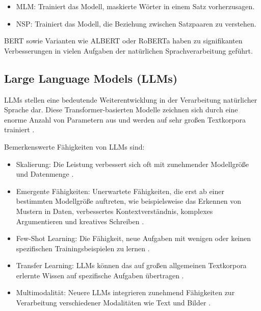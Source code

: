 \begin{itemize}
	\item \gls{MLM}: Trainiert das Modell, maskierte Wörter in einem Satz vorherzusagen.
	\item \gls{NSP}: Trainiert das Modell, die Beziehung zwischen Satzpaaren zu verstehen.
\end{itemize}

\gls{BERT} \parencite{DevlinJacob2019BPoD} sowie Varianten wie ALBERT \parencite{LanZhenzhong2019AALB} oder RoBERTa \parencite{liu2019robertarobustlyoptimizedbert} haben zu signifikanten Verbesserungen in vielen Aufgaben der natürlichen Sprachverarbeitung geführt.

\subsection{Large Language Models (LLMs)}
\label{subsec:llms}

\glspl{LLM} stellen eine bedeutende Weiterentwicklung in der Verarbeitung natürlicher Sprache dar. Diese Transformer-basierten Modelle zeichnen sich durch eine enorme Anzahl von Parametern aus und werden auf sehr großen Textkorpora trainiert \parencite{VaswaniAshish2023AIAY}.

Bemerkenswerte Fähigkeiten von \glspl{LLM} sind:

\begin{itemize}
	\item Skalierung: Die Leistung verbessert sich oft mit zunehmender Modellgröße und Datenmenge \parencite{TouvronHugo2023LOaE}.
	\item Emergente Fähigkeiten: Unerwartete Fähigkeiten, die erst ab einer bestimmten Modellgröße auftreten, wie beispielsweise das Erkennen von Mustern in Daten, verbessertes Kontextverständnis, komplexes Argumentieren und kreatives Schreiben \parencite{BrownTomB2020LMaF}.
	\item Few-Shot Learning: Die Fähigkeit, neue Aufgaben mit wenigen oder keinen spezifischen Trainingsbeispielen zu lernen \parencite{BrownTomB2020LMaF}.
	\item Transfer Learning: \glspl{LLM} können das auf großen allgemeinen Textkorpora erlernte Wissen auf spezifische Aufgaben übertragen \parencite{DevlinJacob2019BPoD}.
	\item Multimodalität: Neuere \glspl{LLM} integrieren zunehmend Fähigkeiten zur Verarbeitung verschiedener Modalitäten wie Text und Bilder \parencite{LiJunnan2023BBLP}.
\end{itemize}

